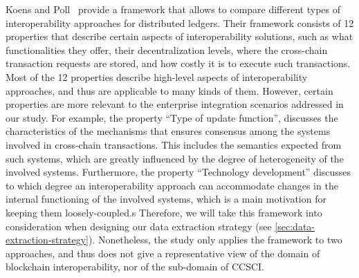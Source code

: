 \documentclass[review]{elsarticle}
\begin{document}
Koens and Poll~\cite{Koens2019Assessing} provide a framework that allows to compare different types of interoperability approaches for distributed ledgers.
Their framework consists of 12 properties that describe certain aspects of interoperability solutions, such as what functionalities they offer, their decentralization levels, where the cross-chain transaction requests are stored, and how costly it is to execute such transactions.
Most of the 12 properties describe high-level aspects of interoperability approaches, and thus are applicable to many kinds of them.
However, certain properties are more relevant to the enterprise integration scenarios addressed in our study.
For example, the property \enquote{Type of update function}, discusses the characteristics of the mechanisms that ensures consensus among the systems involved in cross-chain transactions.
This includes the semantics expected from such systems, which are greatly influenced by the degree of heterogeneity of the involved systems.
Furthermore, the property \enquote{Technology development} discusses to which degree an interoperability approach can accommodate changes in the internal functioning of the involved systems, which is a main motivation for keeping them loosely-coupled.s
Therefore, we will take this framework into consideration when designing our data extraction strategy (see \cref{sec:data-extraction-strategy}).
Nonetheless, the study only applies the framework to two approaches, and thus does not give a representative view of the domain of blockchain interoperability, nor of the sub-domain of CCSCI.
\end{document}

